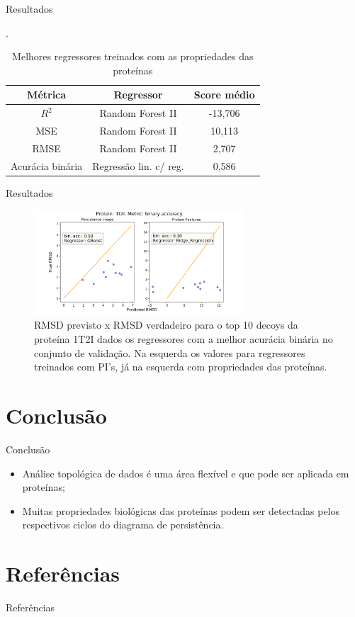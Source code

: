 \documentclass[10pt]{beamer}
\begin{document}
\begin{frame}{Resultados}
\begin{table}[!htbp]
    \centering
    \caption{Melhores regressores treinados com as propriedades das proteínas}.
    \label{tab:rosregr}
    \begin{tabular}{@{}ccc@{}}
        \toprule
        \textbf{Métrica} & \textbf{Regressor} & \textbf{Score médio} \\ \midrule
        $R^2$           & Random Forest II       &-13,706        \\
        MSE             & Random Forest II       & 10,113         \\
        RMSE            & Random Forest II        & 2,707          \\
        Acurácia binária & Regressão lin. c/ reg. & 0,586          \\ \bottomrule
    \end{tabular}
\end{table}
\end{frame}

\begin{frame}{Resultados}
\begin{figure}
    \centering
    \includegraphics[width=0.7\textwidth]{../images/relatorio/1t2i_binary.png}
    \caption{RMSD previsto x RMSD verdadeiro para o top 10 decoys da proteína 1T2I dados os
             regressores com a melhor acurácia binária no conjunto de validação. Na 
            esquerda os valores para regressores treinados com PI's, já na esquerda com propriedades
            das proteínas.}
    \label{fig:1t2i_binary}
\end{figure}
\end{frame}

\section{Conclusão}

\begin{frame}{Conclusão}
    \begin{itemize}
        \item Análise topológica de dados é uma área flexível e que pode ser aplicada em proteínas;
        \item Muitas propriedades biológicas das proteínas podem ser detectadas pelos respectivos ciclos
         do diagrama de persistência.
    \end{itemize}
\end{frame}



\section{Referências}

\begin{frame}[allowframebreaks]{Referências}
  
    \nocite{*}
    
 
\end{frame}
\end{document}

